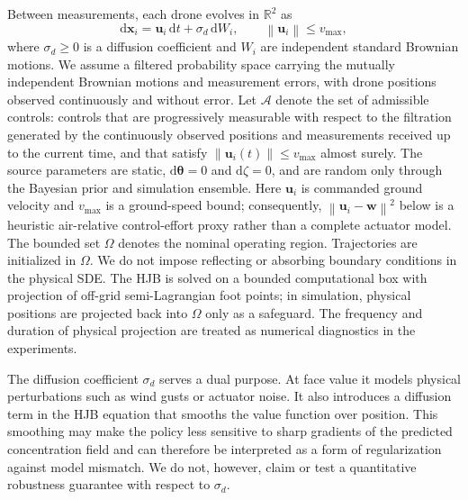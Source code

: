 \documentclass{article}
\newcommand{\R}{\mathbb{R}}
\newcommand{\norm}[1]{\left\|#1\right\|}
\newcommand{\dd}{\mathrm{d}}
\newcommand{\bs}[1]{\boldsymbol{#1}}
\newcommand{\x}{\mathbf{x}}
\renewcommand{\u}{\mathbf{u}}
\begin{document}
Between measurements, each drone evolves in $\R^2$ as
\begin{equation}
\label{eq:dynamics}
\dd\x_i = \u_i\,\dd t + \sigma_d\,\dd W_i,\qquad
\norm{\u_i}\le v_{\max},
\end{equation}
where $\sigma_d\ge 0$ is a diffusion coefficient and $W_i$ are independent standard Brownian motions.
We assume a filtered probability space carrying the mutually independent Brownian motions and measurement errors, with drone positions observed continuously and without error.
Let $\mathcal A$ denote the set of admissible controls: controls that are progressively measurable with respect to the filtration generated by the continuously observed positions and measurements received up to the current time, and that satisfy $\norm{\u_i(t)}\le v_{\max}$ almost surely.
The source parameters are static, $\dd\bs\theta=0$ and $\dd\zeta=0$, and are random only through the Bayesian prior and simulation ensemble.
Here $\u_i$ is commanded ground velocity and $v_{\max}$ is a ground-speed bound; consequently, $\norm{\u_i-\bs w}^2$ below is a heuristic air-relative control-effort proxy rather than a complete actuator model.
The bounded set $\Omega$ denotes the nominal operating region.
Trajectories are initialized in $\Omega$.
We do not impose reflecting or absorbing boundary conditions in the physical SDE.
The HJB is solved on a bounded computational box with projection of off-grid semi-Lagrangian foot points; in simulation, physical positions are projected back into $\Omega$ only as a safeguard.
The frequency and duration of physical projection are treated as numerical diagnostics in the experiments.

The diffusion coefficient $\sigma_d$ serves a dual purpose.
At face value it models physical perturbations such as wind gusts or actuator noise.
It also introduces a diffusion term in the HJB equation that smooths the value function over position.
This smoothing may make the policy less sensitive to sharp gradients of the predicted concentration field and can therefore be interpreted as a form of regularization against model mismatch.
We do not, however, claim or test a quantitative robustness guarantee with respect to $\sigma_d$.
\end{document}
